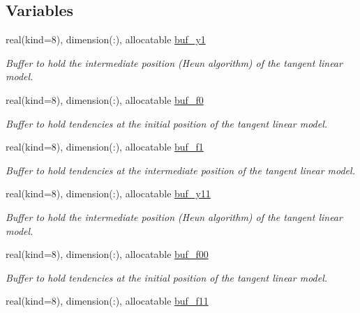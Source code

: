 \subsection*{Variables}
\begin{DoxyCompactItemize}
\item 
real(kind=8), dimension(\+:), allocatable \hyperlink{namespacetl__ad__integrator_a54c26282330477995b554805fbacf236}{buf\+\_\+y1}
\begin{DoxyCompactList}\small\item\em Buffer to hold the intermediate position (Heun algorithm) of the tangent linear model. \end{DoxyCompactList}\item 
real(kind=8), dimension(\+:), allocatable \hyperlink{namespacetl__ad__integrator_ad0e2f29027e4317cae009ca0c4ad1b5a}{buf\+\_\+f0}
\begin{DoxyCompactList}\small\item\em Buffer to hold tendencies at the initial position of the tangent linear model. \end{DoxyCompactList}\item 
real(kind=8), dimension(\+:), allocatable \hyperlink{namespacetl__ad__integrator_ac466cd6f698dc9fed5fc3ab46f30b9a5}{buf\+\_\+f1}
\begin{DoxyCompactList}\small\item\em Buffer to hold tendencies at the intermediate position of the tangent linear model. \end{DoxyCompactList}\item 
real(kind=8), dimension(\+:), allocatable \hyperlink{namespacetl__ad__integrator_ae17c25e2843c5f18b69c133ccca1d483}{buf\+\_\+y11}
\begin{DoxyCompactList}\small\item\em Buffer to hold the intermediate position (Heun algorithm) of the tangent linear model. \end{DoxyCompactList}\item 
real(kind=8), dimension(\+:), allocatable \hyperlink{namespacetl__ad__integrator_ac1d8e51e7ef84e4b5cbab851759fa983}{buf\+\_\+f00}
\begin{DoxyCompactList}\small\item\em Buffer to hold tendencies at the initial position of the tangent linear model. \end{DoxyCompactList}\item 
real(kind=8), dimension(\+:), allocatable \hyperlink{namespacetl__ad__integrator_ad772309f6a78f335766cec48e65747ba}{buf\+\_\+f11}

\end{DoxyCompactItemize}
